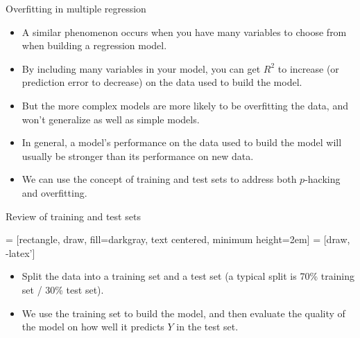 \documentclass{beamer}\usepackage[]{graphicx}\usepackage[]{color}
\newenvironment{knitrout}{}{} %
\begin{document}
\begin{darkframes}
\begin{frame}
\begin{knitrout}


\end{knitrout}
    \end{frame}

    \begin{frame}{Overfitting in multiple regression}
      \begin{itemize}[<+->]
        \item A similar phenomenon occurs when you have many variables to choose from when building a regression model.
        \item By including many variables in your model, you can get $R^2$ to increase (or prediction error to decrease) on the data used to build the model.
        \item But the more complex models are more likely to be \alert{overfitting} the data, and won't generalize as well as simple models.
        \item In general, a model's performance on the data used to build the model will usually be stronger than its performance on new data.
        \item We can use the concept of training and test sets to address both $p$-hacking and overfitting.
      \end{itemize}
    \end{frame}

    \begin{frame}{Review of training and test sets}
      \begin{center}
         = [rectangle, draw, fill=darkgray,
          text centered, minimum height=2em]
         = [draw, -latex']

      \end{center}

      \begin{itemize}
        \item Split the data into a \alert{training set} and a \alert{test set} (a typical split is 70\% training set / 30\% test set).
        \item We use the training set to build the model, and then evaluate the quality of the model on how well it predicts $Y$ in the test set.
      \end{itemize}
    \end{frame}


\end{darkframes}
\end{document}
